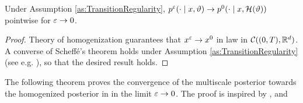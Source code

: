 \documentclass[10pt]{article}
\begin{document}
\begin{lemma}\label{lem:TransitionConvergence} Under Assumption \ref{as:TransitionRegularity}, $p^\varepsilon(\cdot \mid x, \vartheta) \to p^0(\cdot \mid x, \mathcal H(\vartheta))$ pointwise for $\varepsilon \to 0$.
\end{lemma}
\begin{proof} Theory of homogenization guarantees that $x^\varepsilon \to x^0$ in law in $\mathcal C((0, T), \mathbb{R}^d)$. A converse of Scheffé's theorem holds under Assumption \ref{as:TransitionRegularity} (see e.g. \cite{Swe86, Boo85}), so that the desired result holds.
\end{proof}

The following theorem proves the convergence of the multiscale posterior towards the homogenized posterior in in the limit $\varepsilon \to 0$. The proof is inspired by \cite[Proposition 4.6]{Stu10}, \cite[Theorem 3.1]{LST18} and \cite[Theorem 5]{AbD18}
\end{document}
